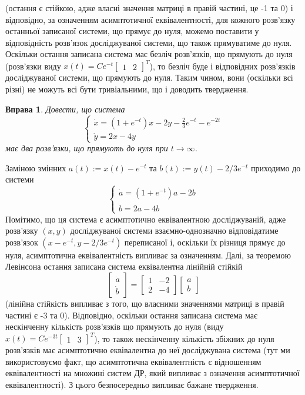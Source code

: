 \documentclass[12pt]{article} %
\newtheorem{prob}{Вправа}
\begin{document}
(остання є стійкою, адже власні значення матриці в правій частині, це -1 та 0) і відповідно, за означенням асимптотичної 
еквівалентності, для кожного розв’язку останньої записаної системи, що прямує до нуля, можемо поставити у відповідність розв’язок
досліджуваної системи, що також прямуватиме до нуля. Оскільки остання записана система має безліч розв’язків, що прямують до нуля
(розв’язки виду $x(t)=Ce^{-t}\begin{bmatrix}1&2\end{bmatrix}^T$), то безліч буде і відповідних розв’язків досліджуваної системи, що
прямують до нуля. Таким чином, вони (оскільки всі різні) не можуть всі бути тривіальними, що і доводить твердження.
\begin{prob}Довести, що система
\[\begin{cases}\dot{x}=(1+e^{-t})x-2y-\frac{2}{3}e^{-t}-e^{-2t}\\\dot{y}=2x-4y\end{cases}\]
має два розв’язки, що прямують до нуля при $t\to\infty$.
\end{prob}
Заміною змінних $a(t):=x(t)-e^{-t}$ та $b(t):=y(t)-2/3e^{-t}$ приходимо до системи
\[\begin{cases}\dot{a}=(1+e^{-t})a-2b\\\dot{b}=2a-4b\end{cases}\]
Помітимо, що ця система є асимптотично еквівалентною досліджуваній, адже розв’язку $(x,y)$ досліджуваної системи взаємно-однозначно
відповідатиме розв’язок
$(x-e^{-t},y-2/3e^{-t})$ переписаної і, оскільки їх різниця прямує до нуля, асимптотична еквівалентність випливає за означенням. Далі,
за теоремою Левінсона остання записана система еквівалентна лінійній стійкій
\[\begin{bmatrix}\dot{a}\\\dot{b}\end{bmatrix}=\begin{bmatrix}1&-2\\2&-4\end{bmatrix}\begin{bmatrix}a\\b\end{bmatrix}\]
(лінійна стійкість випливає з того, що власними значеннями матриці в правій частині є -3 та 0). Відповідно, оскільки остання записана система
має нескінченну кількість розв’язків що прямують до нуля (виду $x(t)=Ce^{-3t}\begin{bmatrix}1&3\end{bmatrix}^T$), то також нескінченну кількість
збіжних до нуля розв’язків має асимптотично еквівалентна до неї досліджувана система (тут ми використовуємо факт, що асимптотична еквівалентність
є відношенням еквівалентності на множині систем ДР, який випливає з означення асимптотичної еквівалентності). З цього безпосередньо випливає
бажане твердження.
\end{document}
